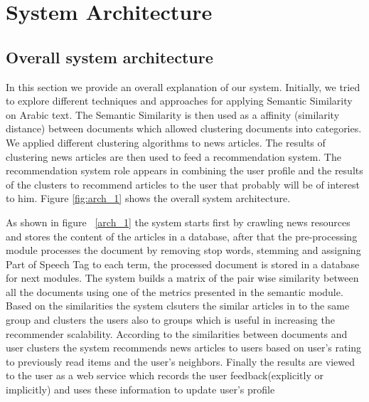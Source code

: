 
\chapter{System Architecture} %

\label{sysArch} %


\section{Overall system architecture}
In this section we provide an overall explanation of our system.  Initially, we tried to explore different techniques and approaches for applying Semantic Similarity on Arabic text. The Semantic Similarity is then used as a affinity (similarity distance) between documents which allowed clustering documents into categories. We applied different clustering algorithms to news articles. The results of clustering news articles are then used to feed a recommendation system. The recommendation system role appears in combining the user profile and the results of the clusters to recommend articles to the user that probably will be of interest to him. Figure \ref{fig:arch_1} shows the overall system architecture.

As shown in figure ~\ref{arch_1} the system starts first by crawling news resources and stores the content of the articles in a database, after that the pre-processing module processes the document by removing stop words, stemming and assigning Part of Speech Tag to each term, the processed document is stored in a database for next modules. The system builds a matrix of the pair wise similarity between all the documents using one of the  metrics presented in the semantic module. Based on the similarities the system clsuters the similar articles in to the same group and clusters the users also to groups which is useful in increasing the recommender scalability. According to the similarities between documents and user clusters the system recommends news articles to users based on user's rating to previously read items and the user's neighbors. Finally the results are viewed to the user as a web service which records the user feedback(explicitly or implicitly) and uses these information to update user's profile

